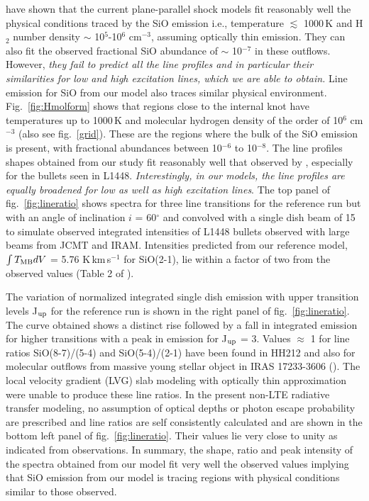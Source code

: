 \documentclass[useAMS,usenatbib]{mn2e}
\begin{document}
\cite{Nisini:2007p13128} have shown that the current
plane-parallel shock models fit reasonably well the physical
conditions traced by the SiO emission i.e., temperature $\lesssim$
1000\,K and H$_{2}$ number density $\sim$ 10$^{5}$-10$^{6}$
cm$^{-3}$, assuming optically thin emission. 
They can also fit the observed fractional SiO abundance of
$\sim$ 10$^{-7}$ in these outflows. However, {\em they fail to predict all
the line profiles and in particular their similarities for low and
high excitation lines, which we are able to obtain.} 
Line emission for SiO from our model also traces similar
physical environment. Fig.~\ref{fig:Hmolform} shows that regions close
to the internal knot have temperatures up to 1000\,K and molecular
hydrogen density of the order of 10$^{6}$ cm$^{-3}$ (also see
fig.~\ref{grid}). These are the regions where the bulk of the SiO
emission is present, with fractional abundances between 10$^{-6}$ to 10$^{-8}$.
The line profiles shapes obtained from our study fit reasonably well that observed by
\cite{Nisini:2007p13128}, especially for the bullets seen in
L1448. {\em Interestingly, in our models, the line profiles are equally broadened for low as well
as high excitation lines}. The top panel of fig.~\ref{fig:lineratio} shows spectra for three line
transitions for the reference run but with an angle of inclination
$i$ = 60$^{\circ}$ and convolved with a single dish beam of
15\arcsec\,to simulate observed integrated
intensities of L1448 bullets observed with large beams from JCMT and
IRAM. Intensities predicted from our reference model, $\int T_{\rm MB}
dV$ = 5.76 K\,km\,s$^{-1}$ for SiO(2-1), 
lie within a factor of two from the observed values (Table 2 of \citealt{Nisini:2007p13128}).
%


The variation of normalized integrated single dish emission with upper transition
levels J$_{\rm up}$ for the reference run is shown in the
right panel of fig.~\ref{fig:lineratio}. The curve obtained 
shows a distinct rise followed by a fall in
integrated emission for higher transitions with a peak in
emission for J$_{\rm up}$ = 3. 
Values $\approx$ 1 for line ratios SiO(8-7)/(5-4) and SiO(5-4)/(2-1) have been
found in HH212 \citep{Cabrit:2007p13804,
  Lee:2008p13697} and also for molecular outflows from massive
young stellar object in IRAS 17233-3606 (\citealt{Leurini:2013p13165}).
The local velocity gradient (LVG) slab modeling with optically thin approximation were unable to produce
these line ratios. 
In the present non-LTE radiative transfer modeling, no assumption of optical
depths or photon escape probability are prescribed and line ratios are
self consistently calculated and are shown in the bottom left panel of
fig.~\ref{fig:lineratio}. Their values lie very close to unity as
indicated from observations. 
In summary, the shape, ratio and peak intensity of the spectra
obtained from our model fit very well the observed values implying
that SiO emission from our model is tracing regions with physical
conditions similar to those observed. 
\end{document}
